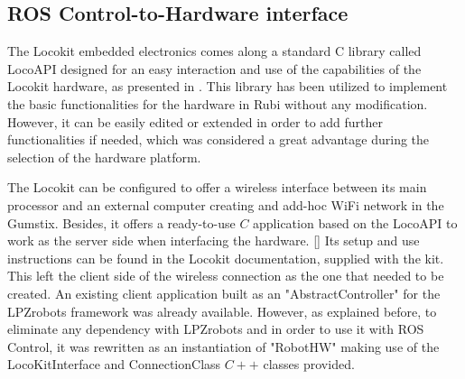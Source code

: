 \subsection{ROS Control-to-Hardware interface} %
\label{sub:ros_control_hardware_locokit_interface}
The Locokit embedded electronics comes along a standard C library called LocoAPI designed for an easy interaction and use of the capabilities of the Locokit hardware, as presented in \cite{locokit}.
This library has been utilized to implement the basic functionalities for the hardware in Rubi without any modification.
However, it can be easily edited or extended in order to add further functionalities if needed, which was considered a great advantage during the selection of the hardware platform.

The Locokit can be configured to offer a wireless interface between its main processor and an external computer creating and add-hoc WiFi network in the Gumstix.
Besides, it offers a ready-to-use $C$ application based on the LocoAPI to work as the server side when interfacing the hardware. \ref{} %
Its setup and use instructions can be found in the Locokit documentation, supplied with the kit.
This left the client side of the wireless connection as the one that needed to be created.
An existing client application built as an "AbstractController" for the LPZrobots framework was already available. 
However, as explained before, to eliminate any dependency with LPZrobots and in order to use it with ROS Control, it was rewritten as an instantiation of "RobotHW" making use of the LocoKitInterface and ConnectionClass $C++$ classes provided.





